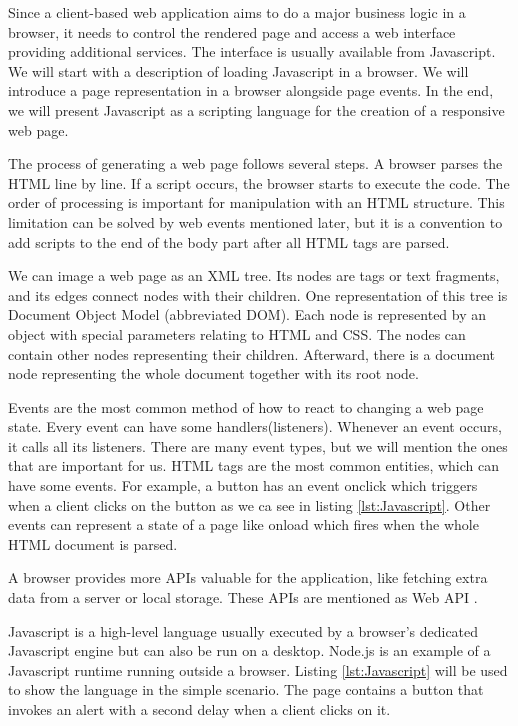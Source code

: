 Since a client-based web application aims to do a major business logic in a browser, it needs to control the rendered page and access a web interface providing additional services.
The interface is usually available from Javascript.
We will start with a description of loading Javascript in a browser.
We will introduce a page representation in a browser alongside page events.
In the end, we will present Javascript as a scripting language for the creation of a responsive web page.
\par
The process of generating a web page follows several steps.
A browser parses the HTML line by line. If a script occurs, the browser starts to execute the code.
The order of processing is important for manipulation with an HTML structure.
This limitation can be solved by web events mentioned later, but
it is a convention to add scripts to the end of the body part after all HTML tags are parsed.
\par
We can image a web page as an XML tree.
Its nodes are tags or text fragments, and its edges connect nodes with their children.
One representation of this tree is Document Object Model (abbreviated DOM).
Each node is represented by an object with special parameters relating to HTML and CSS. 
The nodes can contain other nodes representing their children.
Afterward, there is a document node representing the whole document together with its root node.
\par
Events are the most common method of how to react to changing a web page state.
Every event can have some handlers(listeners).
Whenever an event occurs, it calls all its listeners.
There are many event types, but we will mention the ones that are important for us.
HTML tags are the most common entities, which can have some events.
For example, a button has an event onclick which triggers when a client clicks on the button as we ca see in listing \ref{lst:Javascript}. 
Other events can represent a state of a page like onload which fires when the whole HTML document is parsed.
\par
A browser provides more APIs valuable for the application, like fetching extra data from a server or local storage.
These APIs are mentioned as Web API .
\par
Javascript is a high-level language usually executed by a browser's dedicated Javascript engine but can also be run on a desktop.
Node.js is an example of a Javascript runtime running outside a browser.
Listing \ref{lst:Javascript} will be used to show the language in the simple scenario.
The page contains a button that invokes an alert with a second delay when a client clicks on it.
